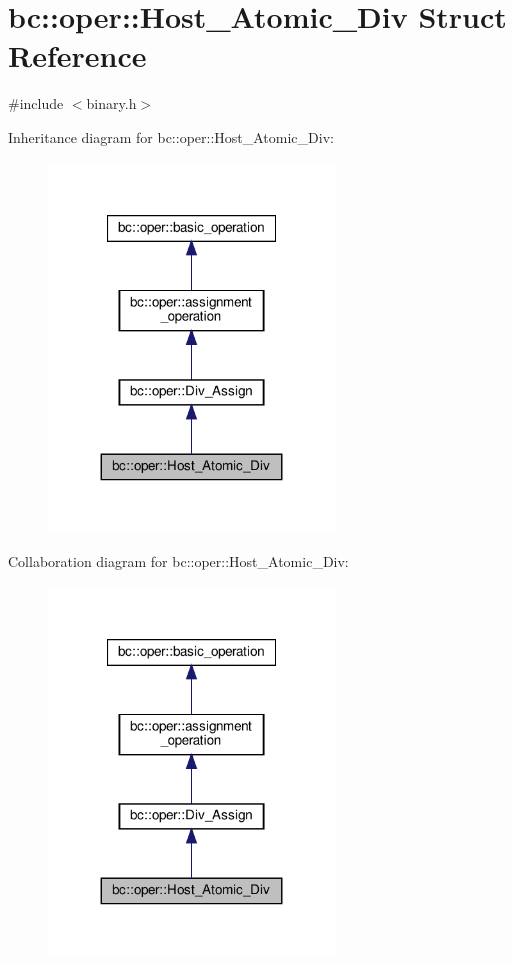 \hypertarget{structbc_1_1oper_1_1Host__Atomic__Div}{}\section{bc\+:\+:oper\+:\+:Host\+\_\+\+Atomic\+\_\+\+Div Struct Reference}
\label{structbc_1_1oper_1_1Host__Atomic__Div}


{\ttfamily \#include $<$binary.\+h$>$}



Inheritance diagram for bc\+:\+:oper\+:\+:Host\+\_\+\+Atomic\+\_\+\+Div\+:\nopagebreak
\begin{figure}[H]
\begin{center}
\leavevmode
\includegraphics[width=215pt]{structbc_1_1oper_1_1Host__Atomic__Div__inherit__graph}
\end{center}
\end{figure}


Collaboration diagram for bc\+:\+:oper\+:\+:Host\+\_\+\+Atomic\+\_\+\+Div\+:\nopagebreak
\begin{figure}[H]
\begin{center}
\leavevmode
\includegraphics[width=215pt]{structbc_1_1oper_1_1Host__Atomic__Div__coll__graph}
\end{center}
\end{figure}
